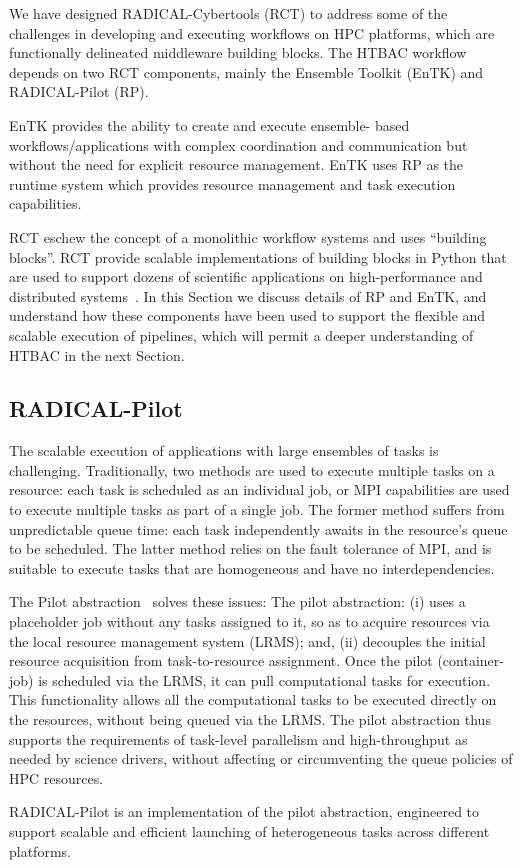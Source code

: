We have designed RADICAL-Cybertools (RCT) to address some of the challenges
in developing and executing workflows on HPC platforms, which are
functionally delineated middleware building blocks. The HTBAC workflow
depends on two RCT components, mainly the Ensemble Toolkit (EnTK) and
RADICAL-Pilot (RP).

EnTK provides the ability to create and execute ensemble- based
workflows/applications with complex coordination and communication but
without the need for explicit resource management. EnTK uses RP as the
runtime system which provides resource management and task execution
capabilities.

RCT eschew the concept of a monolithic workflow systems and uses ``building
blocks''. RCT provide scalable implementations of building blocks in Python
that are used to support dozens of scientific applications on 
high-performance and distributed systems~\cite{turilli2016analysis, angius2017converging,treikalis2016repex, balasubramanian2016ensemble, balasubramanian2016extasy}. 
In this Section we discuss details of RP and EnTK, and understand how these
components have been used to support the flexible and scalable execution of
pipelines, which will permit a deeper understanding of HTBAC in the next
Section.

\subsection{RADICAL-Pilot}

The scalable execution of applications with large ensembles of tasks is
challenging. Traditionally, two methods are used to execute multiple tasks on
a resource: each task is scheduled as an individual job, or MPI capabilities
are used to execute multiple tasks as part of a single job. The former method
suffers from unpredictable queue time: each task independently awaits in the
resource's queue to be scheduled. The latter method relies on the fault
tolerance of MPI, and is suitable to execute tasks that are homogeneous and
have no interdependencies.

The Pilot abstraction~\cite{turilli2017comprehensive} solves these issues:
The pilot abstraction: (i) uses a placeholder job without any tasks assigned
to it, so as to acquire resources via the local resource management system
(LRMS); and, (ii) decouples the initial resource acquisition from
task-to-resource assignment. Once the pilot (container-job) is scheduled via
the LRMS, it can pull computational tasks for execution. This functionality
allows all the computational tasks to be executed directly on the resources,
without being queued via the LRMS\@. %
The pilot abstraction thus supports the requirements of task-level
parallelism and high-throughput as needed by science drivers, without
affecting or circumventing the queue policies of HPC resources.

RADICAL-Pilot is an implementation of the pilot abstraction, engineered to
support scalable and efficient launching of heterogeneous tasks across
different platforms.
